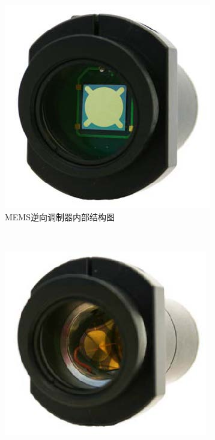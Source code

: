 \begin{figure}[t]
	\centering
	\begin{subfigure}[c]{0.3\textwidth}
		\includegraphics[width=\textwidth]{./Img/boston-MEMS-MRR-INNER.jpg}
		\caption{MEMS逆向调制器内部结构图}
		\label{fig:boston-MEMS-MRR-INNER.jpg}
	\end{subfigure}%
	~%
	\begin{subfigure}[c]{0.3\textwidth}
		\includegraphics[width=\textwidth]{./Img/boston-MEMS-MRR-outer.jpg}

\end{subfigure}
\end{figure}
